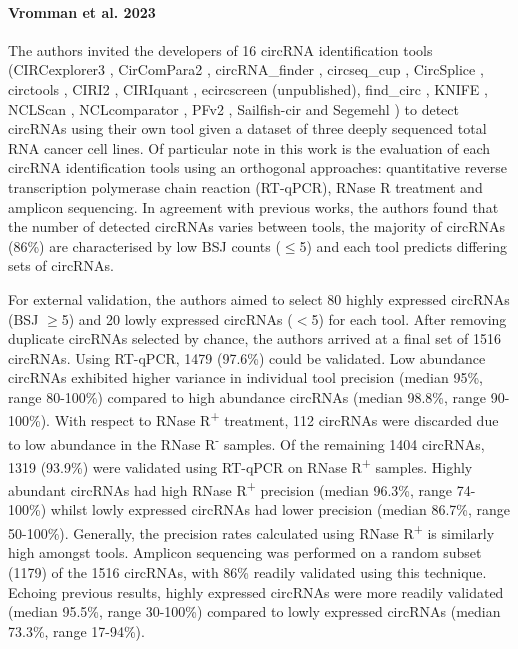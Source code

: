 \paragraph*{Vromman et al. 2023}
The authors invited the developers of 16 circRNA identification tools (CIRCexplorer3 \cite{CIRCexplorer3}, CirComPara2 \cite{CirComPara2}, circRNA\_finder \cite{circRNAfinder}, circseq\_cup \cite{circseqcup}, CircSplice \cite{CircSplice}, circtools \cite{circtools}, CIRI2 \cite{CIRI2}, CIRIquant \cite{CIRIquant}, ecircscreen (unpublished), find\_circ \cite{findcirc}, KNIFE \cite{KNIFE}, NCLScan \cite{NCLscan}, NCLcomparator \cite{NCLcomparator}, PFv2 \cite{PFv2}, Sailfish-cir \cite{Sailfishcir} and Segemehl \cite{segemehl}) to detect circRNAs using their own tool given a dataset of three deeply sequenced total RNA cancer cell lines. Of particular note in this work is the evaluation of each circRNA identification tools using an orthogonal approaches: quantitative reverse transcription polymerase chain reaction (RT-qPCR), RNase R treatment and amplicon sequencing. In agreement with previous works, the authors found that the number of detected circRNAs varies between tools, the majority of circRNAs (86\%) are characterised by low BSJ counts ($\leq$5) and each tool predicts differing sets of circRNAs. \par

For external validation, the authors aimed to select 80 highly expressed circRNAs (BSJ $\geq$5) and 20 lowly expressed circRNAs ($<$5) for each tool. After removing duplicate circRNAs selected by chance, the authors arrived at a final set of 1516 circRNAs. Using RT-qPCR, 1479 (97.6\%) could be validated. Low abundance circRNAs exhibited higher variance in individual tool precision (median 95\%, range 80-100\%) compared to high abundance circRNAs (median 98.8\%, range 90-100\%). With respect to RNase R\textsuperscript{+} treatment, 112 circRNAs were discarded due to low abundance in the RNase R\textsuperscript{-} samples. Of the remaining 1404 circRNAs, 1319 (93.9\%) were validated using RT-qPCR on RNase R\textsuperscript{+} samples. Highly abundant circRNAs had high RNase R\textsuperscript{+} precision (median 96.3\%, range 74-100\%) whilst lowly expressed circRNAs had lower precision (median 86.7\%, range 50-100\%). Generally, the precision rates calculated using RNase R\textsuperscript{+} is similarly high amongst tools. Amplicon sequencing was performed on a random subset (1179) of the 1516 circRNAs, with 86\% readily validated using this technique. Echoing previous results, highly expressed circRNAs were more readily validated (median 95.5\%, range 30-100\%) compared to lowly expressed circRNAs (median 73.3\%, range 17-94\%). \par

